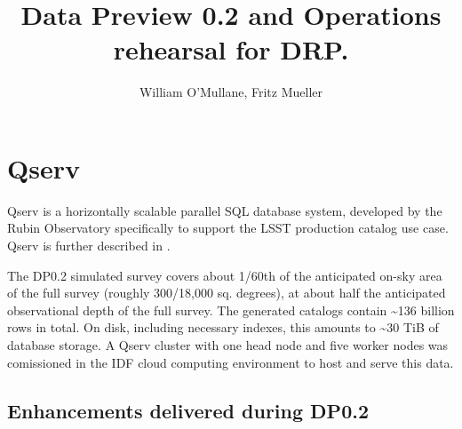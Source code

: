 \documentclass[OPS,authoryear,toc]{lsstdoc}
\title{Data Preview 0.2 and Operations rehearsal for DRP.}
\author{%
  William O'Mullane,
  Fritz Mueller
}
\date{\vcsDate}
\begin{document}
\maketitle


\section{Qserv}\label{sec:qserv}

Qserv is a horizontally scalable parallel SQL database system, developed by the Rubin Observatory specifically
to support the LSST production catalog use case.  Qserv is further described in .

The DP0.2 simulated survey covers about 1/60th of the anticipated on-sky area of the full survey (roughly
300/18,000 sq. degrees), at about half the anticipated observational depth of the full survey.  The generated
catalogs contain \textasciitilde{}136 billion rows in total.  On disk, including necessary indexes, this
amounts to \textasciitilde{}30 TiB of database storage.  A Qserv cluster with one head node and five worker
nodes was comissioned in the IDF cloud computing environment to host and serve this data.

\subsection{Enhancements delivered during DP0.2}
\end{document}
